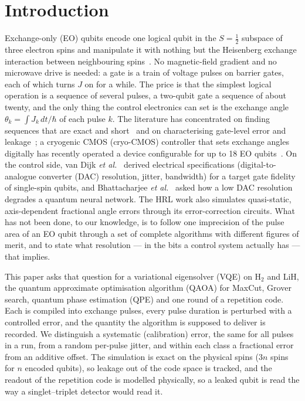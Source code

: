\documentclass[reprint,aps,pra,amsmath,amssymb,superscriptaddress,letterpaper]{revtex4-2}
\newcommand{\Hz}{\mathrm{H}_2}
\begin{document}
\section{Introduction}

Exchange-only (EO) qubits encode one logical qubit in the $S=\tfrac12$
subspace of three electron spins and manipulate it with nothing but the
Heisenberg exchange interaction between neighbouring
spins~\cite{bacon2000,divincenzo2000,kempe2001}. No magnetic-field gradient and
no microwave drive is needed: a gate is a train of voltage pulses on barrier
gates, each of which turns $J$ on for a while. The price is that the simplest
logical operation is a sequence of several pulses, a two-qubit gate a sequence
of about twenty, and the only thing the control electronics can set is the
exchange angle $\theta_k=\int J_k\,dt/\hbar$ of each pulse $k$. The literature
has concentrated on finding sequences that are exact and
short~\cite{fong2011,zeuch2016,setiawan2014,chadwick2024} and on characterising gate-level error and leakage~\cite{andrews2019,weinstein2023}; a cryogenic CMOS (cryo-CMOS) controller that sets exchange angles digitally has recently operated a device configurable for up to 18 EO qubits~\cite{hrl2026}. On the control side, van Dijk \emph{et al.}~\cite{vandijk2019} derived electrical specifications (digital-to-analogue converter (DAC) resolution, jitter, bandwidth) for a target gate fidelity of single-spin qubits, and Bhattacharjee \emph{et al.}~\cite{bhattacharjee2026} asked how a low DAC resolution degrades a quantum neural network. The HRL work also simulates quasi-static, axis-dependent fractional angle errors through its error-correction circuits. What has not been done, to our knowledge, is to follow one imprecision of the pulse area of an EO qubit through a set of complete algorithms with different figures of merit, and to state what resolution --- in the bits a control system actually has --- that implies.

This paper asks that question for a variational eigensolver (VQE) on $\Hz$ and
LiH, the quantum approximate optimisation algorithm (QAOA) for MaxCut, Grover
search, quantum phase estimation (QPE) and one round of a repetition code. Each
is compiled into exchange pulses, every pulse duration is perturbed with a
controlled error, and the quantity the algorithm is supposed to deliver is
recorded. We distinguish a systematic (calibration) error, the same for all
pulses in a run, from a random per-pulse jitter, and within each class a
fractional error from an additive offset. The simulation is exact on the
physical spins ($3n$ spins for $n$ encoded qubits), so leakage out of the code
space is tracked, and the readout of the repetition code is modelled
physically, so a leaked qubit is read the way a singlet--triplet detector
would read it.
\end{document}
